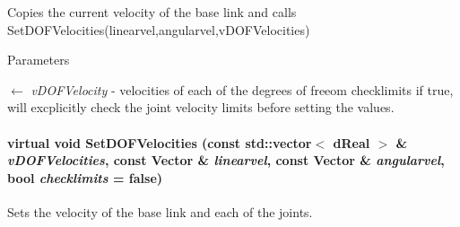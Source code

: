 Copies the current velocity of the base link and calls SetDOFVelocities(linearvel,angularvel,vDOFVelocities) 
\begin{DoxyParams}{Parameters}
\item[\mbox{$\leftarrow$} {\em vDOFVelocity}]-\/ velocities of each of the degrees of freeom  checklimits if true, will excplicitly check the joint velocity limits before setting the values. \end{DoxyParams}
\hypertarget{classOpenRAVE_1_1KinBody_aff61afba85f45d8c7262c5391b271cb1}{
\paragraph[{SetDOFVelocities}]{\setlength{\rightskip}{0pt plus 5cm}virtual void SetDOFVelocities (const std::vector$<$ dReal $>$ \& {\em vDOFVelocities}, \/  const Vector \& {\em linearvel}, \/  const Vector \& {\em angularvel}, \/  bool {\em checklimits} = {\ttfamily false})}\hfill}
\label{classOpenRAVE_1_1KinBody_aff61afba85f45d8c7262c5391b271cb1}


Sets the velocity of the base link and each of the joints. 

